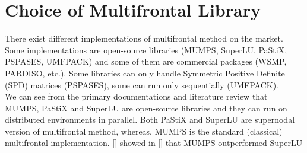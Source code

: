 \section{Choice of Multifrontal Library}
\label{subseq:library-choice}






There exist different implementations of multifrontal method on the market. Some implementations are open-source libraries (MUMPS, SuperLU, PaStiX, PSPASES, UMFPACK) and some of them are commercial packages (WSMP, PARDISO, etc.).
Some libraries can only handle Symmetric Positive Definite (SPD) matrices (PSPASES), some can run only sequentially (UMFPACK).\\

We can see from the primary documentations and literature review that MUMPS, PaStiX and SuperLU are open-source libraries and they can run on distributed environments in parallel. Both PaStiX and SuperLU are supernodal version of multifrontal method, whereas, MUMPS is the standard (classical) multifrontal implementation. [] showed in [] that MUMPS outperformed SuperLU \\
